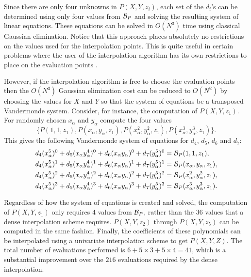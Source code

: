 Since there are only four unknowns in $P(X, Y, z_i)$, each set of the
$d_i$'s can be determined using only four values from ${\cal B}_P$ and
solving the resulting system of linear equations.  These equations can
be solved in $O(N^3)$ time using classical Gaussian elimination.
Notice that this approach places absolutely no restrictions on the
values used for the interpolation points.  This is quite useful in
certain problems where the user of the interpolation algorithm has its
own restrictions to place on the evaluation points \cite{Rubinfeld93}.

However, if the interpolation algorithm is free to choose the
evaluation points then the $O(N^3)$ Gaussian elimination cost can be
reduced to $O(N^2)$ by choosing the values for $X$ and $Y$ so that the
system of equations be a transposed Vandermonde
system. Consider, for instance,
the computation of $P(X,Y,z_1)$.  For randomly chosen $x_{\alpha}$ and
$y_{\alpha}$ compute the four values
\[
\{P(1,1,z_1), P(x_{\alpha},y_{\alpha},z_1),
  P(x_{\alpha}^2,y_{\alpha}^2,z_1),
  P(x_{\alpha}^3,y_{\alpha}^3,z_1) \}.
\]
This gives the following Vandermonde system of equations for $d_4$,
$d_5$, $d_6$ and $d_7$:
\[
\begin{aligned}
d_4 (x_{\alpha}^5)^0 + d_5 (x_{\alpha} y_{\alpha}^4)^0 +
  d_6 (x_{\alpha} y_{\alpha})^0 + d_7 (y_{\alpha}^5)^0
    & = {\cal B}_P(1,1,z_1), \\
d_4 (x_{\alpha}^5)^1 + d_5 (x_{\alpha} y_{\alpha}^4)^1 +
  d_6 (x_{\alpha} y_{\alpha})^1 + d_7 (y_{\alpha}^5)^1
    & = {\cal B}_P(x_{\alpha},y_{\alpha},z_1), \\
d_4 (x_{\alpha}^5)^2 + d_5 (x_{\alpha} y_{\alpha}^4)^2 +
  d_6 (x_{\alpha} y_{\alpha})^2 + d_7 (y_{\alpha}^5)^2
    & = {\cal B}_P(x_{\alpha}^2,y_{\alpha}^2,z_1), \\
d_4 (x_{\alpha}^5)^3 + d_5 (x_{\alpha} y_{\alpha}^4)^3 +
  d_6 (x_{\alpha} y_{\alpha})^3 + d_7 (y_{\alpha}^5)^3
    & = {\cal B}_P(x_{\alpha}^3,y_{\alpha}^3,z_1).
\end{aligned}
\]

Regardless of how the system of equations is created and solved, the 
computation of $P(X, Y, z_1)$ only requires $4$ values from ${\cal B}_P$,
rather than the $36$ values that a dense interpolation scheme 
requires.  $P(X, Y, z_2)$ through $P(X, Y, z_5)$ can be computed in the
same fashion.  Finally, the coefficients of these polynomials can be
interpolated using a univariate interpolation scheme to get $P(X, Y, Z)$.
The total number of evaluations performed is $6 + 5 \times 3 + 5
\times 4 = 41$, which is a substantial improvement over the $216$
evaluations required by the dense interpolation.

